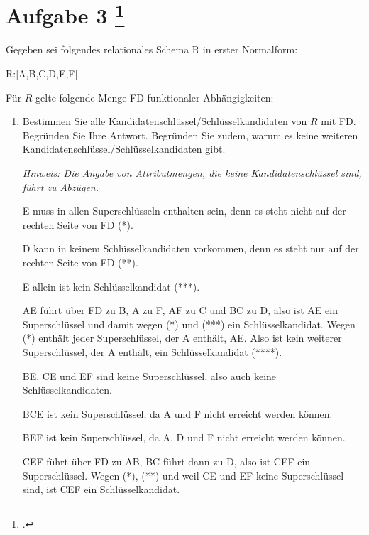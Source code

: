 \documentclass{lehramt-informatik-aufgabe}
\begin{document}
\let\FA=\liFunktionaleAbhaengigkeiten
\liAufgabenTitel{}
\section{Aufgabe 3
\footcite{examen:66116:2020:03}}

Gegeben sei folgendes relationales Schema R in erster Normalform:

\begin{center}
R:{[A,B,C,D,E,F]}
\end{center}

\noindent
Für $R$ gelte folgende Menge FD funktionaler Abhängigkeiten:

\FA{
  A -> F;
  C, E, F -> A, B;
  A, E -> B;
  B, C -> D;
  A, F -> C;
}

\begin{enumerate}


\item Bestimmen Sie alle Kandidatenschlüssel/Schlüsselkandidaten von $R$
mit FD. Begründen Sie Ihre Antwort. Begründen Sie zudem, warum es keine
weiteren Kandidatenschlüssel/Schlüsselkandidaten gibt.

\emph{Hinweis: Die Angabe von Attributmengen, die keine
Kandidatenschlüssel sind, führt zu Abzügen.}

\begin{liAntwort}
E muss in allen Superschlüsseln enthalten sein, denn es steht nicht auf
der rechten Seite von FD (*).

D kann in keinem Schlüsselkandidaten vorkommen, denn es steht nur auf
der rechten Seite von FD (**).

E allein ist kein Schlüsselkandidat (***).

AE führt über FD zu B, A zu F, AF zu C und BC zu D, also ist AE ein
Superschlüssel und damit wegen (*) und (***) ein Schlüsselkandidat.
Wegen (*) enthält jeder Superschlüssel, der A enthält, AE. Also ist kein
weiterer Superschlüssel, der A enthält, ein Schlüsselkandidat (****).

BE, CE und EF sind keine Superschlüssel, also auch keine
Schlüsselkandidaten.

BCE ist kein Superschlüssel, da A und F nicht erreicht werden können.

BEF ist kein Superschlüssel, da A, D und F nicht erreicht werden können.

CEF führt über FD zu AB, BC führt dann zu D, also ist CEF ein
Superschlüssel. Wegen (*), (**) und weil CE und EF keine Superschlüssel
sind, ist CEF ein Schlüsselkandidat.


\end{liAntwort}
\end{enumerate}
\end{document}

